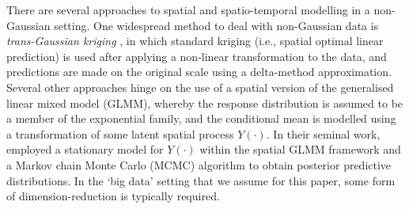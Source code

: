 \documentclass[nojss]{jss}
\begin{document}
There are several approaches to spatial and spatio-temporal modelling in a non-Gaussian setting.
One widespread method to deal with non-Gaussian data is \textit{trans-Gaussian kriging} \citep[pg.~137--138]{Cressie_1993_stats_for_spatial_data}, in which standard kriging (i.e., spatial optimal linear prediction) is used after applying a non-linear transformation to the data, and predictions are made on the original scale using a delta-method approximation. 
 Several other approaches hinge on the use of a spatial version of the generalised linear mixed model (GLMM), whereby the response distribution is assumed to be a member of the exponential family, and the conditional mean is modelled using a transformation of some latent spatial process $Y(\cdot)$. 
 In their seminal work, \cite{Diggle_1998_spatial_GLMM} employed a stationary model for $Y(\cdot)$ within the spatial GLMM framework and a Markov chain Monte Carlo (MCMC) algorithm to obtain posterior predictive distributions. 
 In the `big data' setting that we assume for this paper, some form of dimension-reduction is typically required.
 
\end{document}
